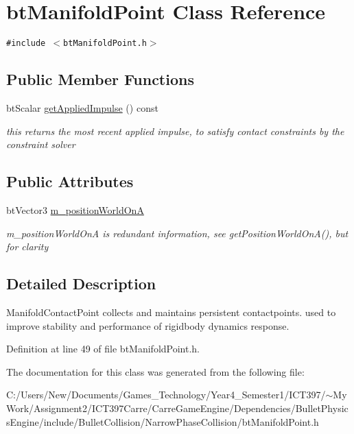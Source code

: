 \hypertarget{classbt_manifold_point}{
\section{btManifoldPoint Class Reference}
\label{classbt_manifold_point}
}
{\tt \#include $<$btManifoldPoint.h$>$}

\subsection*{Public Member Functions}
\begin{CompactItemize}
\item 
\hypertarget{classbt_manifold_point_2506e3d421b66b430db8e8dbf5ad8d1e}{
btScalar \hyperlink{classbt_manifold_point_2506e3d421b66b430db8e8dbf5ad8d1e}{getAppliedImpulse} () const }
\label{classbt_manifold_point_2506e3d421b66b430db8e8dbf5ad8d1e}

\begin{CompactList}\small\item\em this returns the most recent applied impulse, to satisfy contact constraints by the constraint solver \item\end{CompactList}\end{CompactItemize}
\subsection*{Public Attributes}
\begin{CompactItemize}
\item 
\hypertarget{classbt_manifold_point_5fd89785a2e081dd658b15af8bedf04b}{
btVector3 \hyperlink{classbt_manifold_point_5fd89785a2e081dd658b15af8bedf04b}{m\_\-positionWorldOnA}}
\label{classbt_manifold_point_5fd89785a2e081dd658b15af8bedf04b}

\begin{CompactList}\small\item\em m\_\-positionWorldOnA is redundant information, see getPositionWorldOnA(), but for clarity \item\end{CompactList}\end{CompactItemize}


\subsection{Detailed Description}
ManifoldContactPoint collects and maintains persistent contactpoints. used to improve stability and performance of rigidbody dynamics response. 

Definition at line 49 of file btManifoldPoint.h.

The documentation for this class was generated from the following file:\begin{CompactItemize}
\item 
C:/Users/New/Documents/Games\_\-Technology/Year4\_\-Semester1/ICT397/$\sim$My Work/Assignment2/ICT397Carre/CarreGameEngine/Dependencies/BulletPhysicsEngine/include/BulletCollision/NarrowPhaseCollision/btManifoldPoint.h\end{CompactItemize}
